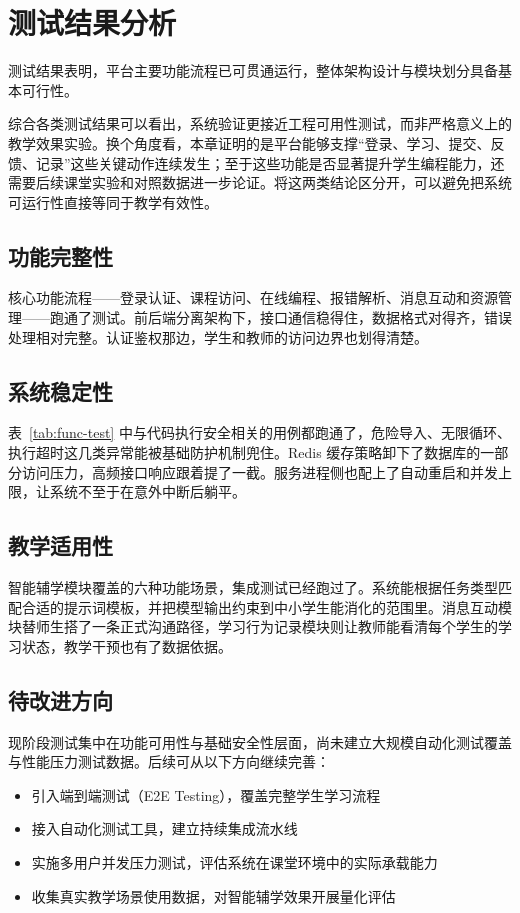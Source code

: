 \section{测试结果分析}
测试结果表明，平台主要功能流程已可贯通运行，整体架构设计与模块划分具备基本可行性。

综合各类测试结果可以看出，系统验证更接近工程可用性测试，而非严格意义上的教学效果实验。换个角度看，本章证明的是平台能够支撑“登录、学习、提交、反馈、记录”这些关键动作连续发生；至于这些功能是否显著提升学生编程能力，还需要后续课堂实验和对照数据进一步论证。将这两类结论区分开，可以避免把系统可运行性直接等同于教学有效性。

\subsection{功能完整性}
核心功能流程——登录认证、课程访问、在线编程、报错解析、消息互动和资源管理——跑通了测试。前后端分离架构下，接口通信稳得住，数据格式对得齐，错误处理相对完整。认证鉴权那边，学生和教师的访问边界也划得清楚。

\subsection{系统稳定性}
表~\ref{tab:func-test} 中与代码执行安全相关的用例都跑通了，危险导入、无限循环、执行超时这几类异常能被基础防护机制兜住。Redis 缓存策略卸下了数据库的一部分访问压力，高频接口响应跟着提了一截。服务进程侧也配上了自动重启和并发上限，让系统不至于在意外中断后躺平。

\subsection{教学适用性}
智能辅学模块覆盖的六种功能场景，集成测试已经跑过了。系统能根据任务类型匹配合适的提示词模板，并把模型输出约束到中小学生能消化的范围里。消息互动模块替师生搭了一条正式沟通路径，学习行为记录模块则让教师能看清每个学生的学习状态，教学干预也有了数据依据。

\subsection{待改进方向}
现阶段测试集中在功能可用性与基础安全性层面，尚未建立大规模自动化测试覆盖与性能压力测试数据。后续可从以下方向继续完善：
\begin{itemize}
  \item 引入端到端测试（E2E Testing），覆盖完整学生学习流程
  \item 接入自动化测试工具，建立持续集成流水线
  \item 实施多用户并发压力测试，评估系统在课堂环境中的实际承载能力
  \item 收集真实教学场景使用数据，对智能辅学效果开展量化评估
\end{itemize}

